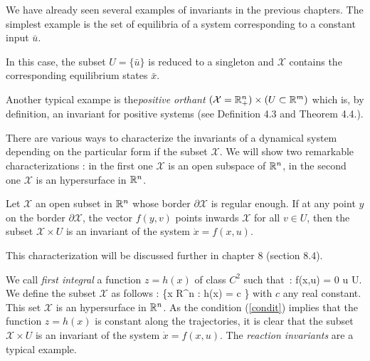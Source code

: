 We have already seen several examples of invariants in the previous chapters. The simplest example is the set of equilibria of a system corresponding to a constant input $\bar u$.  

In this case, the subset $U = \{\bar u\}$ is reduced to a singleton and $\mathcal{X}$
contains the corresponding equilibrium states $\bar x$.  

Another typical exampe is the{\em positive orthant} $(\mathcal{X} = \mathbb{R}^n_+) \times (U \subset \mathbb{R}^m)$
which is, by definition, an invariant for positive systems 
(see Definition 4.3 and Theorem 4.4.).

There are various ways to characterize the invariants of a dynamical system depending on the particular form if the subset $\mathcal{X}$.  We will show two remarkable characterizations : in the first one $\mathcal{X}$
is an open subspace of $\mathbb{R}^n$, in the second one $\mathcal{X}$ is an
hypersurface in $\mathbb{R}^n$.  \\


Let $\mathcal{X}$ an open subset in $\mathbb{R}^n$ whose border $\partial \mathcal{X}$ is regular enough.  If at any point $y$ on the border $\partial \mathcal{X}$, the vector $f(y,v)$ points inwards $\mathcal{X}$ for all $v \in U$, then the subset $\mathcal{X} \times U$
is an invariant of the system $\dot x = f(x,u)$.

This characterization will be discussed further in chapter 8 (section 8.4).\\


We call {\it first integral} a function $z = h(x)$ of class $C^2$ such that~:
\eqn
{}f(x,u) = 0 \;\;\; \forall u \in U. \label{condit}
\eeqn
We define the subset $\mathcal{X}$ as follows :
\eqnn
{} \triangleq \{x \in R^n : h(x) = c \}
\eeqnn
with $c$ any real constant.
This set $\mathcal{X}$ is an hypersurface in $\mathbb{R}^n$.  As the condition (\ref{condit}) implies that the function $z = h(x)$ is constant along the trajectories, it is clear that the subset
$\mathcal{X} \times U$ is an invariant of the system $\dot x = f(x,u)$.  The
{\em reaction invariants} are a typical example. 

